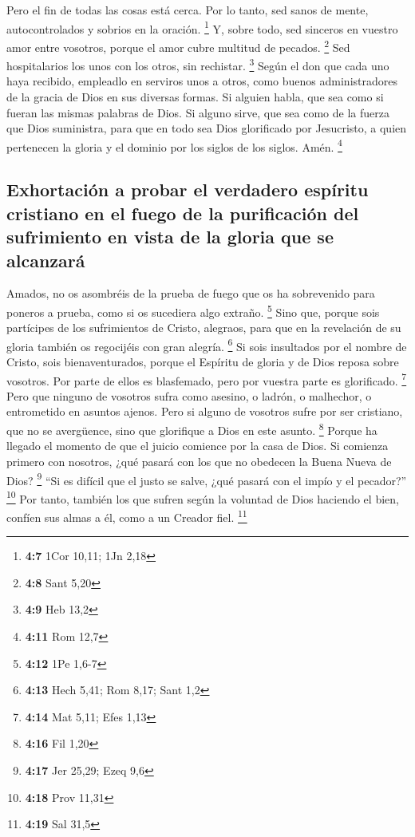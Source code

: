 \begin{paracol}{2}
 Pero el fin de todas las cosas está cerca. Por lo tanto,
sed sanos de mente, autocontrolados y sobrios en la oración. \footnote{\textbf{4:7}
  1Cor 10,11; 1Jn 2,18}  Y, sobre todo, sed sinceros en
vuestro amor entre vosotros, porque el amor cubre multitud de pecados.
\footnote{\textbf{4:8} Sant 5,20}  Sed hospitalarios los
unos con los otros, sin rechistar. \footnote{\textbf{4:9} Heb 13,2}
 Según el don que cada uno haya recibido, empleadlo en
serviros unos a otros, como buenos administradores de la gracia de Dios
en sus diversas formas.  Si alguien habla, que sea como
si fueran las mismas palabras de Dios. Si alguno sirve, que sea como de
la fuerza que Dios suministra, para que en todo sea Dios glorificado por
Jesucristo, a quien pertenecen la gloria y el dominio por los siglos de
los siglos. Amén. \footnote{\textbf{4:11} Rom 12,7}

\hypertarget{exhortaciuxf3n-a-probar-el-verdadero-espuxedritu-cristiano-en-el-fuego-de-la-purificaciuxf3n-del-sufrimiento-en-vista-de-la-gloria-que-se-alcanzaruxe1}{%
\subsection{Exhortación a probar el verdadero espíritu cristiano en el
fuego de la purificación del sufrimiento en vista de la gloria que se
alcanzará}\label{exhortaciuxf3n-a-probar-el-verdadero-espuxedritu-cristiano-en-el-fuego-de-la-purificaciuxf3n-del-sufrimiento-en-vista-de-la-gloria-que-se-alcanzaruxe1}}

 Amados, no os asombréis de la prueba de fuego que os ha
sobrevenido para poneros a prueba, como si os sucediera algo extraño.
\footnote{\textbf{4:12} 1Pe 1,6-7}  Sino que, porque sois
partícipes de los sufrimientos de Cristo, alegraos, para que en la
revelación de su gloria también os regocijéis con gran alegría.
\footnote{\textbf{4:13} Hech 5,41; Rom 8,17; Sant 1,2} 
Si sois insultados por el nombre de Cristo, sois bienaventurados, porque
el Espíritu de gloria y de Dios reposa sobre vosotros. Por parte de
ellos es blasfemado, pero por vuestra parte es glorificado. \footnote{\textbf{4:14}
  Mat 5,11; Efes 1,13}  Pero que ninguno de vosotros
sufra como asesino, o ladrón, o malhechor, o entrometido en asuntos
ajenos.  Pero si alguno de vosotros sufre por ser
cristiano, que no se avergüence, sino que glorifique a Dios en este
asunto. \footnote{\textbf{4:16} Fil 1,20}  Porque ha
llegado el momento de que el juicio comience por la casa de Dios. Si
comienza primero con nosotros, ¿qué pasará con los que no obedecen la
Buena Nueva de Dios? \footnote{\textbf{4:17} Jer 25,29; Ezeq 9,6}
 ``Si es difícil que el justo se salve, ¿qué pasará con
el impío y el pecador?'' \footnote{\textbf{4:18} Prov 11,31}
 Por tanto, también los que sufren según la voluntad de
Dios haciendo el bien, confíen sus almas a él, como a un Creador fiel.
\footnote{\textbf{4:19} Sal 31,5}


\end{paracol}
